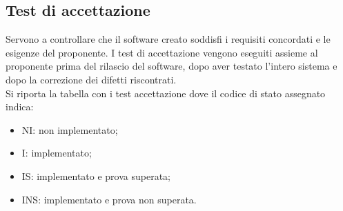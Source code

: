\subsection{Test di accettazione}
Servono a controllare che il software creato soddisfi i requisiti concordati e le esigenze del proponente. I test di accettazione vengono eseguiti assieme al proponente prima del rilascio del software, dopo aver testato l'intero sistema e dopo la correzione dei difetti riscontrati. \\ Si riporta la tabella con i test accettazione dove il codice di stato assegnato indica:
\begin{itemize}
	\item NI: non implementato;
	\item I: implementato;
	\item IS: implementato e prova superata;
	\item INS: implementato e prova non superata.
\end{itemize}
